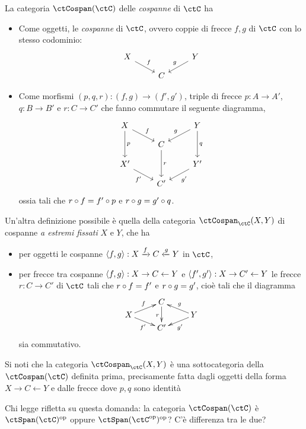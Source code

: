 \begin{definition}
	La categoria \(\ctCospan(\ctC)\) delle \emph{cospanne} di \(\ctC\) ha
	\begin{itemize}
		\item Come oggetti, le \emph{cospanne} di \(\ctC\), ovvero coppie di frecce \(f,g\) di \(\ctC\) con lo stesso codominio:
		      \[
			      \begin{tikzcd}[row sep=small]
				      X \ar{dr}{f} && Y \ar{dl}[swap]{g} \\
				      & C
			      \end{tikzcd}
		      \]
		\item Come morfismi \((p,q,r):(f,g)\to (f',g')\), triple di frecce \(p:A\to A'\), \(q:B\to B'\) e \(r:C\to C'\) che fanno commutare il seguente diagramma,
		      \[
			      \begin{tikzcd}[row sep=small]
				      X \ar{dd}{p} \ar{dr}{f} && Y \ar{dd}{q} \ar{dl}[swap]{g} \\
				      & C \ar{dd}{r} \\
				      X' \ar{dr}[swap]{f'} && Y' \ar{dl}{g'} \\
				      & C'
			      \end{tikzcd}
		      \]
		      ossia tali che \(r\circ f=f'\circ p\) e \(r\circ g=g'\circ q\).
	\end{itemize}
	Un'altra definizione possibile è quella della categoria \(\ctCospan_\ctC(X,Y)\) di cospanne \emph{a estremi fissati} \(X\) e \(Y\), che ha
	\begin{itemize}
		\item per oggetti le cospanne	\(\langle f,g\rangle : X\xrightarrow{f} C\xleftarrow{g} Y\) in \(\ctC\),
		\item per frecce tra cospanne	\(\langle f,g\rangle : X\to C\leftarrow Y\) e \(\langle f',g'\rangle : X\to C'\leftarrow Y\) le frecce \(r : C\to C'\) di \(\ctC\) tali che \(r\circ f = f'\) e \(r\circ g=g'\), cioè tali che il diagramma
		      \[\xymatrix@R=1mm{
			      &C\ar[dd]_r & \\
			      X \ar[dr]_{f'}\ar[ur]^f&& Y\ar[ul]_g\ar[dl]^{g'}\\
			      & C'
			      }\]
		      sia commutativo.
	\end{itemize}
	Si noti che la categoria \(\ctCospan_\ctC(X,Y)\) è una sottocategoria della \(\ctCospan(\ctC)\) definita prima, precisamente fatta dagli oggetti della forma \(X\to C\leftarrow Y\) e dalle frecce dove \(p,q\) sono identità
\end{definition}
Chi legge rifletta su questa domanda: la categoria \(\ctCospan(\ctC)\) è \(\ctSpan(\ctC)^\op\) oppure \(\ctSpan(\ctC^\op)^\op\)? C'è differenza tra le due?
